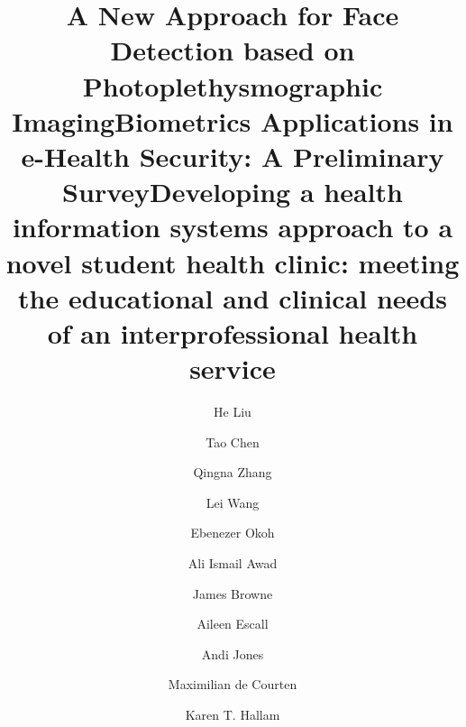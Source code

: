 \documentclass{llncs}
\begin{document}
\clearpage



\setcounter{page}{78}

\title{A New Approach for Face Detection based on Photoplethysmographic Imaging}

\author{He Liu \and Tao Chen \and Qingna Zhang \and Lei Wang}



\maketitle

\clearpage


\setcounter{page}{90}

\title{Biometrics Applications in e-Health Security: A Preliminary Survey}

\author{Ebenezer Okoh \and Ali Ismail Awad}




\maketitle

\clearpage



\setcounter{page}{102}

\title{Developing a health information systems approach to a novel student health clinic: meeting the educational and clinical needs of an interprofessional health service}
\author{James Browne \and Aileen Escall \and Andi Jones \and Maximilian de Courten \and Karen T. Hallam}
\end{document}
